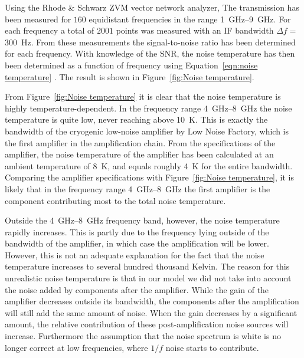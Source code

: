 Using the Rhode \& Schwarz ZVM vector network analyzer, The transmission has been measured for $160$ equidistant frequencies in the range \SIrange{1}{9}{\giga \hertz}. For each frequency a total of $2001$ points was measured with an IF bandwidth $\Delta f = $ \SI{300}{\hertz}. From these measurements the signal-to-noise ratio has been determined for each frequency. With knowledge of the SNR, the noise temperature has then been determined as a function of frequency using Equation~\ref{eqn:noise temperature} . The result is shown in Figure~\ref{fig:Noise temperature}.

From Figure~\ref{fig:Noise temperature} it is clear that the noise temperature is highly temperature-dependent. In the frequency range \SIrange{4}{8}{\giga \hertz} the noise temperature is quite low, never reaching above \SI{10}{\kelvin}. This is exactly the bandwidth of the cryogenic low-noise amplifier by Low Noise Factory, which is the first amplifier in the amplification chain. From the specifications of the amplifier, the noise temperature of the amplifier has been calculated at an ambient temperature of \SI{8}{\kelvin}, and equals roughly \SI{4}{\kelvin} for the entire bandwidth. Comparing the amplifier specifications with Figure~\ref{fig:Noise temperature}, it is likely that in the frequency range \SIrange{4}{8}{\giga \hertz} the first amplifier is the component contributing most to the total noise temperature.

Outside the \SIrange{4}{8}{\giga \hertz} frequency band, however, the noise temperature rapidly increases. This is partly due to the frequency lying outside of the bandwidth of the amplifier, in which case the amplification will be lower. However, this is not an adequate explanation for the fact that the noise temperature increases to several hundred thousand Kelvin. The reason for this unrealistic noise temperature is that in our model we did not take into account the noise added by components after the amplifier. While the gain of the amplifier decreases outside its bandwidth, the components after the amplification will still add the same amount of noise. When the gain decreases by a significant amount, the relative contribution of these post-amplification noise sources will increase. Furthermore the assumption that the noise spectrum is white is no longer correct at low frequencies, where $1/f$ noise starts to contribute.

